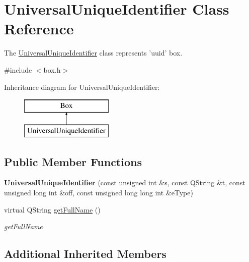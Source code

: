 \hypertarget{class_universal_unique_identifier}{\section{Universal\-Unique\-Identifier Class Reference}
\label{class_universal_unique_identifier}
}


The \hyperlink{class_universal_unique_identifier}{Universal\-Unique\-Identifier} class represents 'uuid' box.  




{\ttfamily \#include $<$box.\-h$>$}

Inheritance diagram for Universal\-Unique\-Identifier\-:\begin{figure}[H]
\begin{center}
\leavevmode
\includegraphics[height=2.000000cm]{class_universal_unique_identifier}
\end{center}
\end{figure}
\subsection*{Public Member Functions}
\begin{DoxyCompactItemize}
\item 
\hypertarget{class_universal_unique_identifier_ae468966215f775b8238e5b7d396b329e}{{\bfseries Universal\-Unique\-Identifier} (const unsigned int \&s, const Q\-String \&t, const unsigned long int \&off, const unsigned long long int \&e\-Type)}\label{class_universal_unique_identifier_ae468966215f775b8238e5b7d396b329e}

\item 
virtual Q\-String \hyperlink{class_universal_unique_identifier_aa2c40da68671ab3f272dcb8514921324}{get\-Full\-Name} ()
\begin{DoxyCompactList}\small\item\em get\-Full\-Name \end{DoxyCompactList}\end{DoxyCompactItemize}
\subsection*{Additional Inherited Members}


